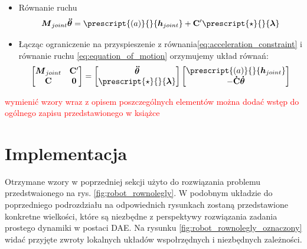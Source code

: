 \begin{itemize}
\begin{equation}
        \end{equation}
    \item Równanie ruchu
        \begin{equation}
            \label{eq:equation_of_motion}
                \boldsymbol{M}_{joint}\boldsymbol{\ddot\theta} = \prescript{(a)}{}{\boldsymbol{h}_{joint}}+\mathbf{C}'\prescript{\star}{}{\boldsymbol{\lambda}}
        \end{equation}
    \item Łącząc ograniczenie na przyspieszenie z równania\ref{eq:acceleration_constraint} i równanie ruchu \ref{eq:equation_of_motion} orzymujemy układ równań:
        \begin{equation}
            \label{eq:DAE_set_of_equations}
            \begin{bmatrix}
                \boldsymbol{M}_{joint}&\mathbf{C}'\\
                \mathbf{C}&\boldsymbol{0}
            \end{bmatrix}
            =
            \begin{bmatrix}
                \boldsymbol{\ddot\theta}\\
                \prescript{\star}{}{\boldsymbol{\lambda}}
            \end{bmatrix}
            \begin{bmatrix}
                \prescript{(a)}{}{\boldsymbol{h}_{joint}}\\
                -\mathbf{\dot C}\boldsymbol{\dot \theta}
            \end{bmatrix}
        \end{equation}
        
        
\end{itemize}

\textcolor{red}{wymienić wzory wraz z opisem poszczególnych elementów można dodać wstęp do ogólnego zapisu przedstawionego w książce}



\section{Implementacja}
\label{sec:implementacja_robot}

Otrzymane wzory w poprzedniej sekcji użyto do rozwiązania problemu przedstwaionego na rys. \ref{fig;robot_rownolegly}. W podobnym układzie do poprzedniego podrozdziału na odpowiednich rysunkach zostaną przedstawione konkretne wielkości, które są niezbędne z perspektywy rozwiązania zadania prostego dynamiki w postaci \gls{DAE}. Na rysunku \ref{fig:robot_rownolegly_oznaczony} widać przyjęte zwroty lokalnych układów wspołrzędnych i niezbędnych zależności.

